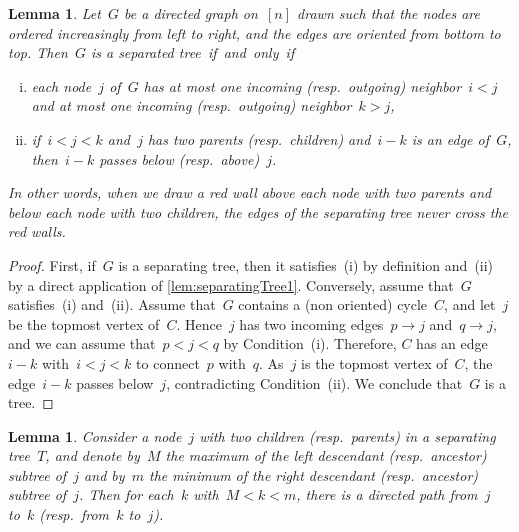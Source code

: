\documentclass{amsart}
\newtheorem{corollary}[theorem]{Corollary}
\newtheorem{lemma}[theorem]{Lemma}
\theoremstyle{definition}
\newcommand{\vincent}[1]{\todo[color=blue!30]{#1 \\ \hfill --- V.}}
\begin{document}

\begin{lemma}
\label{lem:separatingTree2}
Let~$G$ be a directed graph on~$[n]$ drawn such that the nodes are ordered increasingly from left to right, and the edges are oriented from bottom to top.
Then~$G$ is a separated tree~if~and~only~if
\begin{enumerate}[(i)]
\item each node~$j$ of~$G$ has at most one incoming (resp.~outgoing) neighbor~$i < j$ and at most one incoming (resp.~outgoing) neighbor~$k > j$,
\item if~$i < j < k$ and~$j$ has two parents (resp.~children) and~$i-k$ is an edge of~$G$, then~$i-k$ passes below (resp.~above)~$j$.
\end{enumerate}
In other words, when we draw a red wall above each node with two parents and below each node with two children, the edges of the separating tree never cross the red walls.
\end{lemma}

\begin{proof}
First, if~$G$ is a separating tree, then it satisfies~(i) by definition and~(ii) by a direct application of \cref{lem:separatingTree1}.
Conversely, assume that~$G$ satisfies~(i) and~(ii).
Assume that~$G$ contains a (non oriented) cycle~$C$, and let~$j$ be the topmost vertex of~$C$.
Hence~$j$ has two incoming edges~$p \to j$ and~$q \to j$, and we can assume that~$p < j < q$ by Condition~(i).
Therefore, $C$ has an edge~$i-k$ with~$i < j < k$ to connect~$p$ with~$q$.
As~$j$ is the topmost vertex of~$C$, the edge~$i-k$ passes below~$j$, contradicting Condition~(ii).
We conclude that~$G$ is a tree.
\vincent{todo: close this proof}
\end{proof}

\begin{lemma}
\label{lem:separatingTree3}
Consider a node~$j$ with two children (resp.~parents) in a separating tree~$T$, and denote by~$M$ the maximum of the left descendant (resp.~ancestor) subtree of~$j$ and by~$m$ the minimum of the right descendant (resp.~ancestor) subtree of~$j$. Then for each~$k$ with~$M < k < m$, there is a directed path from~$j$ to~$k$ (resp.~from~$k$ to~$j$).
\end{lemma}
\end{document}
